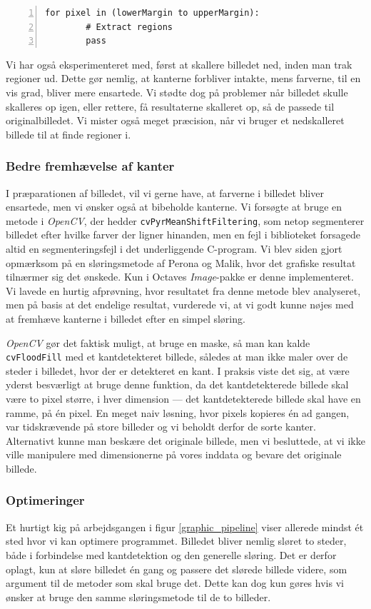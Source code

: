 {\begin{lstlisting}[caption={Pseudokode til udtrækning af regioner med
    margin.},captionpos=b,label={pseudo_fix},numbers=left,
    frame=tb, breaklines=false, float=h]
    for pixel in (lowerMargin to upperMargin):
        # Extract regions
        pass
\end{lstlisting}

Vi har også eksperimenteret med, først at skallere billedet ned, inden
man trak regioner ud. Dette gør nemlig, at kanterne forbliver intakte,
mens farverne, til en vis grad, bliver mere ensartede. Vi stødte dog på
problemer når billedet skulle skalleres op igen, eller rettere, få
resultaterne skalleret op, så de passede til originalbilledet. Vi mister
også meget præcision, når vi bruger et nedskalleret billede til at finde
regioner i.

\subsubsection{Bedre fremhævelse af kanter}
I præparationen af billedet, vil vi gerne have, at farverne i billedet
bliver ensartede, men vi ønsker også at bibeholde kanterne. Vi forsøgte
at bruge en metode i \emph{OpenCV}, der hedder
\texttt{cvPyrMeanShiftFiltering}, som netop segmenterer billedet efter
hvilke farver der ligner hinanden, men en fejl i biblioteket forsagede
altid en segmenteringsfejl i det underliggende C-program. Vi blev siden
gjort opmærksom på en sløringsmetode af Perona og
Malik\cite{perona1990scale}, hvor det grafiske resultat tilnærmer sig
det ønskede. Kun i Octaves \emph{Image}-pakke er denne implementeret. Vi
lavede en hurtig afprøvning, hvor resultatet fra denne metode blev
analyseret, men på basis at det endelige resultat, vurderede vi, at vi
godt kunne nøjes med at fremhæve kanterne i billedet efter en simpel
sløring.

\emph{OpenCV} gør det faktisk muligt, at bruge en maske, så man kan
kalde \texttt{cvFloodFill} med et kantdetekteret billede, således at man
ikke maler over de steder i billedet, hvor der er detekteret en kant. I
praksis viste det sig, at være yderst besværligt at bruge denne
funktion, da det kantdetekterede billede skal være to pixel større, i
hver dimension --- det kantdetekterede billede skal have en ramme, på én
pixel. En meget naiv løsning, hvor pixels kopieres én ad gangen, var
tidskrævende på store billeder og vi beholdt derfor de sorte kanter.
Alternativt kunne man beskære det originale billede, men vi besluttede,
at vi ikke ville manipulere med dimensionerne på vores inddata og bevare
det originale billede.

\subsubsection{Optimeringer}
Et hurtigt kig på arbejdsgangen i figur \ref{graphic_pipeline} viser
allerede mindst ét sted hvor vi kan optimere programmet. Billedet bliver
nemlig sløret to steder, både i forbindelse med kantdetektion og den
generelle sløring. Det er derfor oplagt, kun at sløre billedet én gang
og passere det slørede billede videre, som argument til de metoder som
skal bruge det. Dette kan dog kun gøres hvis vi ønsker at bruge den
samme sløringsmetode til de to billeder.

}
